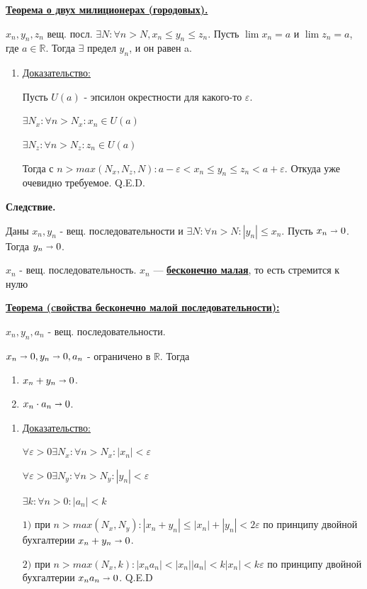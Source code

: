 \documentclass{article}
\newcommand{\deff}[1]{\underline{\textbf{#1}}}
\newcommand{\thmm}[1]{\underline{\textbf{#1}}}
\begin{document}
\thmm{Теорема о двух милиционерах (городовых).}

$x_n,y_n,z_n$ вещ. посл. $\exists N:\forall n>N, x_n \leq y_n \leq z_n$. Пусть $\lim x_n = a$ и $\lim z_n=a$, где $a \in \mathbb{R}$. Тогда $\exists$ предел $y_n$, и он равен a.

\begin{enumerate}
    \item[] \uline{Доказательство:}

    Пусть $U(a)$ - эпсилон окрестности для какого-то $\varepsilon$.

    $\exists N_x : \forall n> N_x: x_n \in U(a)$

    $\exists N_z : \forall n> N_z: z_n \in U(a)$

    Тогда  с $n > max(N_x, N_z,N): a - \varepsilon < x_n \leq y_n \leq z_n < a + \varepsilon$. Откуда уже очевидно требуемое. Q.E.D.
    
\end{enumerate}

\textbf{Следствие.}

Даны $x_n,y_n$ - вещ. последовательности и $\exists N:\forall n>N: |y_n|\leq x_n$. Пусть $x_n \shortrightarrow 0$. Тогда $y_n \shortrightarrow 0$.

$x_n$ - вещ. последовательность. $x_n$ --- \deff{бесконечно малая}, то есть стремится к нулю

\thmm{Теорема (cвойства бесконечно малой последовательности):}

$x_n,y_n,a_n$ - вещ. последовательности. 

$x_n \shortrightarrow 0, y_n \shortrightarrow 0, a_n$ - ограничено в $\mathbb{R}$.
Тогда
\begin{enumerate}
    \item $x_n + y_n \shortrightarrow 0$.

    \item $x_n \cdot a_n \shortrightarrow 0$.

\end{enumerate}
\begin{enumerate}
    \item[] \uline{Доказательство:}

    $\forall \varepsilon > 0 \exists N_x: \forall n > N_x: |x_n|<\varepsilon$

    $\forall \varepsilon > 0 \exists N_y: \forall n > N_y: |y_n|<\varepsilon$

    $\exists k: \forall n>0: |a_n|<k$

    $1)$ при $n> max(N_x, N_y): |x_n+y_n|\leq|x_n|+|y_n|<2\varepsilon$ по принципу двойной бухгалтерии $x_n+y_n \shortrightarrow 0$.

    $2)$ при $n>max(N_x,k): |x_na_n|<|x_n||a_n|<k|x_n|<k\varepsilon$ по принципу двойной бухгалтерии $x_na_n \shortrightarrow 0$. Q.E.D
\end{enumerate}
\end{document}
